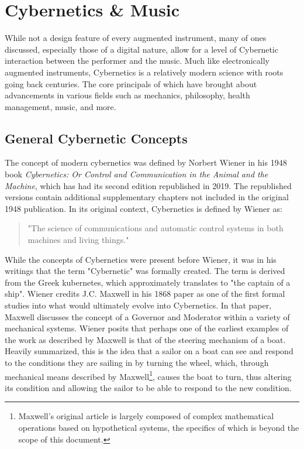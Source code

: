 \newpage

\section{Cybernetics \& Music}
While not a design feature of every augmented instrument, many of ones discussed, especially those of a digital nature, allow for a level of Cybernetic interaction between the performer and the music. Much like electronically augmented instruments, Cybernetics is a relatively modern science with roots going back centuries. The core principals of which have brought about advancements in various fields such as mechanics, philosophy, health management, music, and more. 

\subsection{General Cybernetic Concepts} %

The concept of modern cybernetics was defined by Norbert Wiener in his 1948 book \textit{Cybernetics: Or Control and Communication in the Animal and the Machine}, which has had its second edition republished in 2019\cite{WeinerCybernetics2019}. The republished versions contain additional supplementary chapters not included in the original 1948 publication. In its original context, Cybernetics is defined by Wiener as: 

\begin{quote}
    "The science of communications and automatic control systems in both machines and living things."
\end{quote} 

While the concepts of Cybernetics were present before Wiener, it was in his writings that the term "Cybernetic" was formally created. The term is derived from the Greek kubernetes, which approximately translates to "the captain of a ship"\cite{WeinerCybernetics2019}. Wiener credits J.C. Maxwell in his 1868 paper as one of the first formal studies into what would ultimately evolve into Cybernetics. In that paper, Maxwell discusses the concept of a Governor and Moderator within a variety of mechanical systems\cite{maxwellOnGoverners}. Wiener posits that perhaps one of the earliest examples of the work as described by Maxwell is that of the steering mechanism of a boat\cite{WeinerCybernetics2019}. Heavily summarized, this is the idea that a sailor on a boat can see and respond to the conditions they are sailing in by turning the wheel, which, through mechanical means described by Maxwell\footnote{Maxwell's original article is largely composed of complex mathematical operations based on hypothetical systems, the specifics of which is beyond the scope of this document.}, causes the boat to turn, thus altering its condition and allowing the sailor to be able to respond to the new condition.

